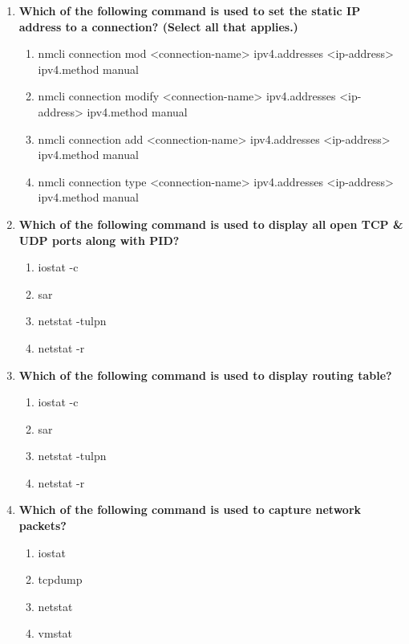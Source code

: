 \begin{flushleft}
\begin{enumerate}
		
		\item \textbf{Which of the following command is used to set the static IP address to a connection? (Select all that applies.)}
		\begin{enumerate}[label=(\alph*)]
			\item nmcli connection mod <connection-name> ipv4.addresses <ip-address> ipv4.method manual   %
			\item nmcli connection modify <connection-name> ipv4.addresses <ip-address> ipv4.method manual  %
			\item nmcli connection add <connection-name> ipv4.addresses <ip-address> ipv4.method manual
			\item nmcli connection type <connection-name> ipv4.addresses <ip-address> ipv4.method manual
		\end{enumerate}
		\bigskip
		\bigskip	
		

		\item \textbf{Which of the following command is used to display all open TCP \& UDP ports along with PID?}
		\begin{enumerate}[label=(\alph*)]
			\item iostat -c 
			\item sar  
			\item netstat -tulpn   %
			\item netstat -r
		\end{enumerate}
		\bigskip
		\bigskip	
		
		
		\item \textbf{Which of the following command is used to display routing table?}
		\begin{enumerate}[label=(\alph*)]
			\item iostat -c 
			\item sar  
			\item netstat -tulpn   
			\item netstat -r    %
		\end{enumerate}
		\bigskip
		\bigskip	
		
		\item \textbf{Which of the following command is used to capture network packets?}
		\begin{enumerate}[label=(\alph*)]
			\item iostat
			\item tcpdump  %
			\item netstat
			\item vmstat
		\end{enumerate}
	\end{enumerate}
\end{flushleft}
